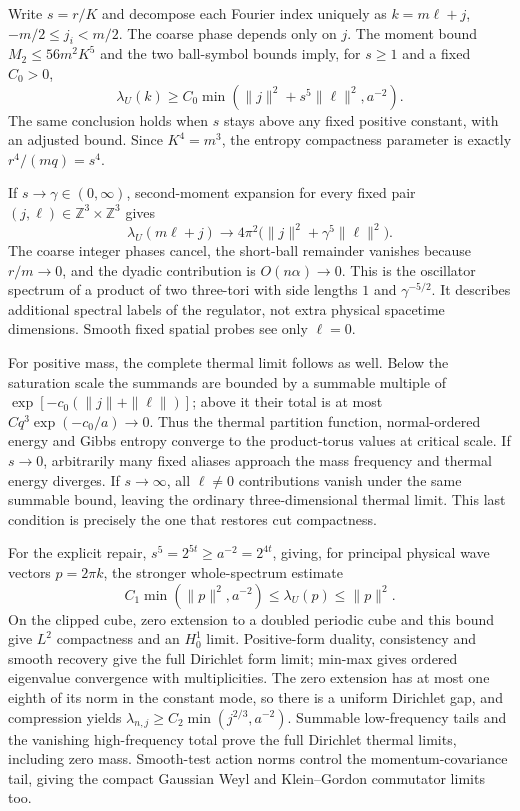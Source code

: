 Write $s=r/K$ and decompose each Fourier index uniquely as
$k=m\ell+j$, $-m/2\le j_i<m/2$. The coarse phase depends only on $j$.
The moment bound $M_2\le56m^2K^5$ and the two ball-symbol bounds imply,
for $s\ge1$ and a fixed $C_0>0$,
\[
 \lambda_U(k)\ge C_0\min(\|j\|^2+s^5\|\ell\|^2,a^{-2}).
\]
The same conclusion holds when $s$ stays above any fixed positive constant,
with an adjusted bound. Since $K^4=m^3$, the entropy compactness parameter
is exactly $r^4/(mq)=s^4$.

If $s\to\gamma\in(0,\infty)$, second-moment expansion for every fixed
pair $(j,\ell)\in\mathbb Z^3\times\mathbb Z^3$ gives
\[
 \lambda_U(m\ell+j)\longrightarrow
 4\pi^2\bigl(\|j\|^2+\gamma^5\|\ell\|^2\bigr).
\]
The coarse integer phases cancel, the short-ball remainder vanishes because
$r/m\to0$, and the dyadic contribution is $O(n\alpha)\to0$.
This is the oscillator spectrum of a product of two three-tori with side
lengths $1$ and $\gamma^{-5/2}$. It describes additional spectral labels
of the regulator, not extra physical spacetime dimensions. Smooth fixed
spatial probes see only $\ell=0$.

For positive mass, the complete thermal limit follows as well. Below the
saturation scale the summands are bounded by a summable multiple of
$\exp[-c_0(\|j\|+\|\ell\|)]$; above it their total is at most
$Cq^3\exp(-c_0/a)\to0$. Thus the thermal partition function,
normal-ordered energy and Gibbs entropy converge to the product-torus
values at critical scale. If $s\to0$, arbitrarily many fixed aliases
approach the mass frequency and thermal energy diverges. If $s\to\infty$,
all $\ell\ne0$ contributions vanish under the same summable bound,
leaving the ordinary three-dimensional thermal limit. This last condition
is precisely the one that restores cut compactness.

For the explicit repair, $s^5=2^{5t}\ge a^{-2}=2^{4t}$, giving, for principal
physical wave vectors $p=2\pi k$, the stronger whole-spectrum estimate
\[
 C_1\min(\|p\|^2,a^{-2})\le\lambda_U(p)\le\|p\|^2.
\]
On the clipped cube, zero extension to a doubled periodic cube and this
bound give $L^2$ compactness and an $H_0^1$ limit. Positive-form duality,
consistency and smooth recovery give the full Dirichlet form limit;
min-max gives ordered eigenvalue convergence with multiplicities. The
zero extension has at most one eighth of its norm in the constant mode,
so there is a uniform Dirichlet gap, and compression yields
$\lambda_{n,j}\ge C_2\min(j^{2/3},a^{-2})$.
Summable low-frequency tails and the vanishing high-frequency total prove
the full Dirichlet thermal limits, including zero mass. Smooth-test action
norms control the momentum-covariance tail, giving the compact Gaussian
Weyl and Klein--Gordon commutator limits too.


